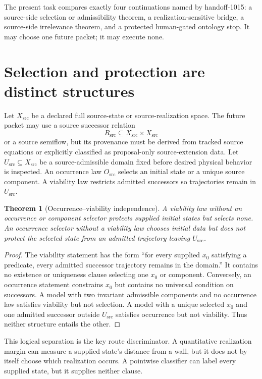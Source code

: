 \documentclass[11pt]{article}
\newtheorem{theorem}{Theorem}
\newcommand{\Xsrc}{X_{\mathrm{src}}}
\newcommand{\Rsrc}{R_{\mathrm{src}}}
\newcommand{\Usrc}{U_{\mathrm{src}}}
\newcommand{\Osrc}{O_{\mathrm{src}}}
\begin{document}
The present task compares exactly four continuations named by handoff-1015:
a source-side selection or admissibility theorem, a realization-sensitive
bridge, a source-side irrelevance theorem, and a protected human-gated
ontology stop.  It may choose one future packet; it may execute none.

\section{Selection and protection are distinct structures}

Let $\Xsrc$ be a declared full source-state or source-realization space.  The
future packet may use a source successor relation
\[
  \Rsrc\subseteq \Xsrc\times\Xsrc
\]
or a source semiflow, but its provenance must be derived from tracked source
equations or explicitly classified as proposal-only source-extension data.
Let $\Usrc\subseteq\Xsrc$ be a source-admissible domain fixed before desired
physical behavior is inspected.  An occurrence law $\Osrc$ selects an initial
state or a unique source component.  A viability law restricts admitted
successors so trajectories remain in $\Usrc$.

\begin{theorem}[Occurrence--viability independence]
A viability law without an occurrence or component selector protects supplied
initial states but selects none.  An occurrence selector without a viability
law chooses initial data but does not protect the selected state from an
admitted trajectory leaving $\Usrc$.
\end{theorem}

\begin{proof}
The viability statement has the form ``for every supplied $x_0$ satisfying a
predicate, every admitted successor trajectory remains in the domain.''  It
contains no existence or uniqueness clause selecting one $x_0$ or component.
Conversely, an occurrence statement constrains $x_0$ but contains no universal
condition on successors.  A model with two invariant admissible components
and no occurrence law satisfies viability but not selection.  A model with a
unique selected $x_0$ and one admitted successor outside $\Usrc$ satisfies
occurrence but not viability.  Thus neither structure entails the other.
\end{proof}

This logical separation is the key route discriminator.  A quantitative
realization margin can measure a supplied state's distance from a wall, but it
does not by itself choose which realization occurs.  A pointwise classifier
can label every supplied state, but it supplies neither clause.
\end{document}
